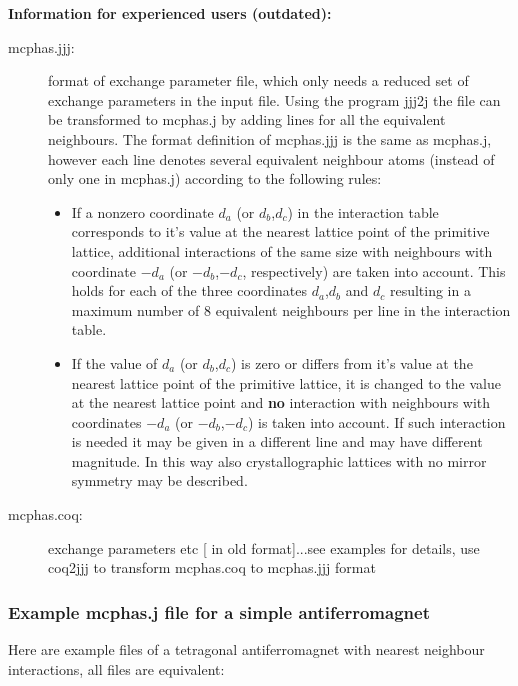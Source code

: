 {\tiny {\bf Information for experienced users (outdated):}
\begin{description}
\item[\prg mcphas.jjj:]
format of exchange parameter file, which only needs a reduced set of exchange
parameters in the input file. Using the program {\prg jjj2j} the file can be transformed
to {\prg mcphas.j} by adding lines for all the equivalent neighbours. The format definition
of {\prg mcphas.jjj} is the same as {\prg mcphas.j}, however each line denotes several
equivalent neighbour atoms (instead of only one in {\prg mcphas.j}) according to the
 following rules:
\begin{itemize}
\item If a nonzero coordinate $d_a$ (or $d_b$,$d_c$) in the interaction table
 corresponds to it's value at the nearest
 lattice point of the primitive lattice,
  additional interactions of the same size
with  neighbours with coordinate $-d_a$ (or $-d_b$,$-d_c$, respectively)
are taken into account. This
holds for each of the three coordinates $d_a$,$d_b$ and $d_c$
 resulting in a maximum
number of 8 equivalent neighbours per line in the interaction table.
\item If the value of $d_a$ (or $d_b$,$d_c$) is zero or differs
from it's value at the nearest lattice point of the primitive lattice, it is 
changed to the value at the nearest lattice point and {\bf no} interaction 
with  neighbours with coordinates $-d_a$ (or $-d_b$,$-d_c$) is
 taken into account. If such
 interaction is needed it may be given in a different line and may
have different magnitude. In this way also crystallographic lattices
with no mirror symmetry may be described.
\end{itemize}
\item[\prg mcphas.coq:]   exchange parameters etc [ in old format]...see examples for details, use {\prg coq2jjj} to 
transform {\prg mcphas.coq} to {\prg mcphas.jjj} format
\end{description}

}


\subsubsection{Example {\prg mcphas.j} file for a simple antiferromagnet}

Here are example files of a tetragonal antiferromagnet with nearest neighbour interactions, all
files are equivalent:

